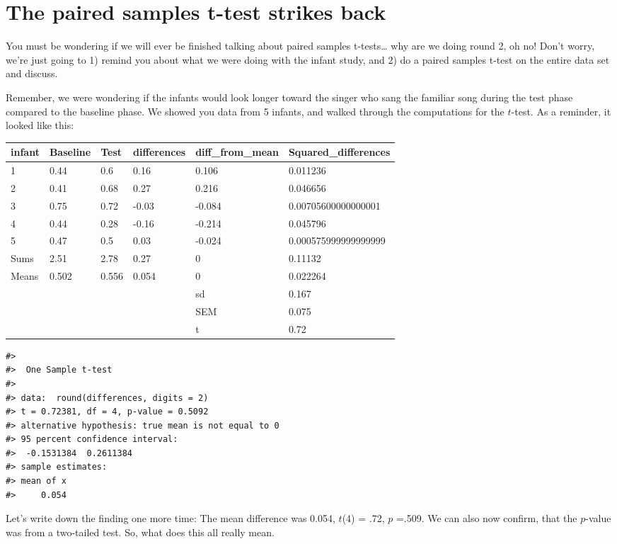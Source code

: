 \documentclass[
  letterpaper,
  DIV=11,
  numbers=noendperiod]{scrreprt}
\begin{document}
\section{The paired samples t-test strikes
back}\label{the-paired-samples-t-test-strikes-back}

You must be wondering if we will ever be finished talking about paired
samples t-tests\ldots{} why are we doing round 2, oh no! Don't worry,
we're just going to 1) remind you about what we were doing with the
infant study, and 2) do a paired samples t-test on the entire data set
and discuss.

Remember, we were wondering if the infants would look longer toward the
singer who sang the familiar song during the test phase compared to the
baseline phase. We showed you data from 5 infants, and walked through
the computations for the \(t\)-test. As a reminder, it looked like this:

\begin{tabular}{l|l|l|l|l|l}
\hline
infant & Baseline & Test & differences & diff\_from\_mean & Squared\_differences\\
\hline
1 & 0.44 & 0.6 & 0.16 & 0.106 & 0.011236\\
\hline
2 & 0.41 & 0.68 & 0.27 & 0.216 & 0.046656\\
\hline
3 & 0.75 & 0.72 & -0.03 & -0.084 & 0.00705600000000001\\
\hline
4 & 0.44 & 0.28 & -0.16 & -0.214 & 0.045796\\
\hline
5 & 0.47 & 0.5 & 0.03 & -0.024 & 0.000575999999999999\\
\hline
Sums & 2.51 & 2.78 & 0.27 & 0 & 0.11132\\
\hline
Means & 0.502 & 0.556 & 0.054 & 0 & 0.022264\\
\hline
 &  &  &  & sd & 0.167\\
\hline
 &  &  &  & SEM & 0.075\\
\hline
 &  &  &  & t & 0.72\\
\hline
\end{tabular}

\begin{verbatim}
#> 
#>  One Sample t-test
#> 
#> data:  round(differences, digits = 2)
#> t = 0.72381, df = 4, p-value = 0.5092
#> alternative hypothesis: true mean is not equal to 0
#> 95 percent confidence interval:
#>  -0.1531384  0.2611384
#> sample estimates:
#> mean of x 
#>     0.054
\end{verbatim}

Let's write down the finding one more time: The mean difference was
0.054, \(t\)(4) = .72, \(p\) =.509. We can also now confirm, that the
\(p\)-value was from a two-tailed test. So, what does this all really
mean.
\end{document}
